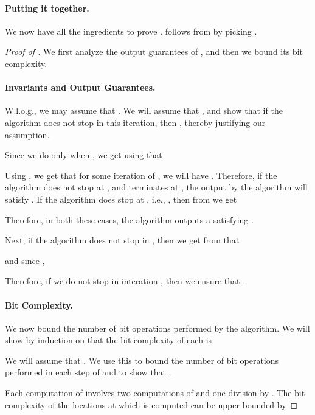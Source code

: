 \documentclass{article}[12pt]
\theoremstyle{definition}
\begin{document}
\paragraph{Putting it together.}
We now have all the ingredients to prove . 
follows from  by picking .
\begin{proof}[Proof of ]
We first analyze the output guarantees of , and then we bound its bit complexity. 

\paragraph{Invariants and Output Guarantees.}
W.l.o.g., we may assume that .
We will assume that , and show that if the algorithm does not
stop in this iteration, then , thereby justifying our assumption.

Since we do  only when , we get using  
that 

Using ,  we get that for some iteration 
 of , 
we will have .
Therefore, if the algorithm does not stop at , and 
terminates at , the  output by the algorithm
will satisfy .
If the algorithm does stop at , i.e., 
, then from  we get

Therefore, in both these cases, the algorithm outputs a  satisfying 
.

Next, if the algorithm does not stop in , then we get from
 that  

and since ,  

Therefore, if we do not stop in interation , then we ensure that  
.

\paragraph{Bit Complexity.}
We now bound the number of bit operations performed by the algorithm. 
We will show by induction on  that the bit complexity of each  is 

We will assume that . We use this to
bound the number of bit operations performed in each step of  
and to show that .


Each computation of  involves two computations of 
and one division by . The bit complexity of the locations at which 
 is computed can be upper bounded by 


\end{proof}
\end{document}
